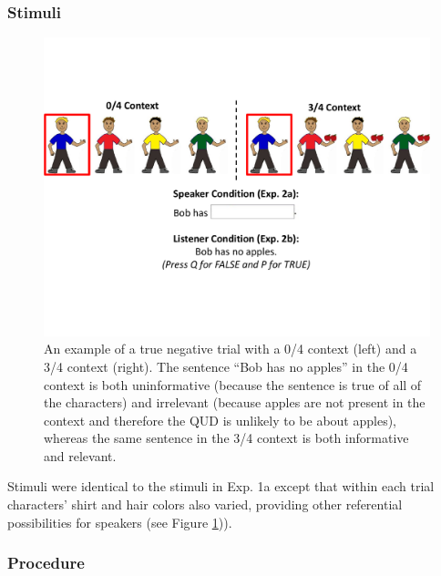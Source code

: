 \documentclass[man, floatsintext, noapacite]{apa6}
\begin{document}
\subsubsection{Stimuli}

\begin{figure}[t]
\begin{center} 
\includegraphics[width=6in]{figures/experiment2/trialfig_exp2.pdf}
\caption{\label{fig:exp2_trial} An example of a true negative trial with a 0/4 context (left) and a 3/4 context (right).  The sentence ``Bob has no apples'' in the 0/4 context is both uninformative (because the sentence is true of all of the characters) and irrelevant (because apples are not present in the context and therefore the QUD is unlikely to be about apples), whereas the same sentence in the 3/4 context is both informative and relevant. }
\vspace{-5mm}
\end{center} 
\end{figure}

Stimuli were identical to the stimuli in Exp. 1a except that within each trial characters' shirt and hair colors also varied, providing other referential possibilities for speakers (see Figure \ref{fig:exp2_trial})). 

\subsubsection{Procedure}
\end{document}

